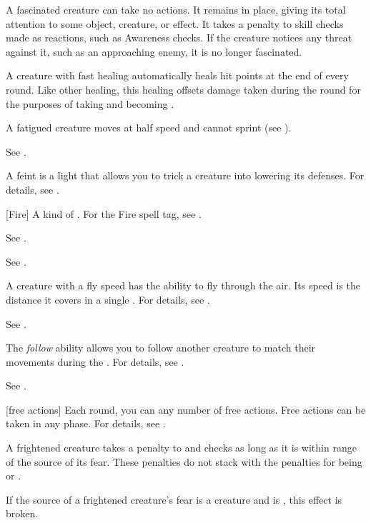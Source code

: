  A fascinated creature can take no actions. It remains in place, giving its total attention to some object, creature, or effect. It takes a  penalty to skill checks made as reactions, such as Awareness checks. If the creature notices any threat against it, such as an approaching enemy, it is no longer fascinated.

 A creature with fast healing automatically heals hit points at the end of every round.
Like other healing, this healing offsets damage taken during the round for the purposes of taking  and becoming \wounded.

 A fatigued creature moves at half speed and cannot sprint (see ).

 See .

 A feint is a light  that allows you to trick a creature into lowering its defenses.
For details, see .

[Fire] A kind of . For the Fire spell tag, see .

 See .

 See .

 A creature with a fly speed has the ability to fly through the air.
Its speed is the distance it covers in a single .
For details, see .

 See .

 The \textit{follow} ability allows you to follow another creature to match their movements during the .
For details, see .

 See .

[free actions] Each round, you can any number of free actions.
Free actions can be taken in any phase.
For details, see .

 A frightened creature takes a  penalty to  and checks as long as it is within \rngmed range of the source of its fear.
These penalties do not stack with the penalties for being \shaken or \panicked.

If the source of a frightened creature's fear is a creature and is , this effect is broken.


